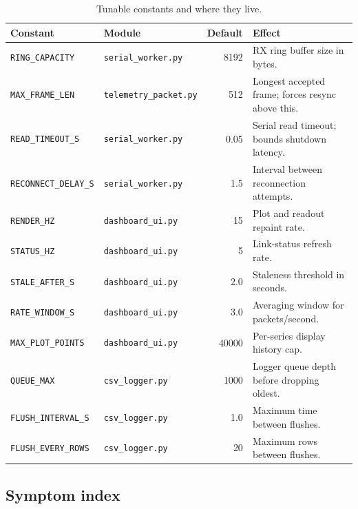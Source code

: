 \documentclass[11pt,a4paper]{article}
\newcommand{\file}[1]{\texttt{#1}}
\newcommand{\code}[1]{\texttt{#1}}
\begin{document}
\begin{table}[htbp]
\centering
\caption{Tunable constants and where they live.}
\label{tab:constants}
\small
\begin{tabularx}{\textwidth}{@{}llrX@{}}
\toprule
\textbf{Constant} & \textbf{Module} & \textbf{Default} & \textbf{Effect}\\
\midrule
\code{RING\_CAPACITY}     & \file{serial\_worker.py} & 8192 & RX ring buffer size in bytes.\\
\code{MAX\_FRAME\_LEN}    & \file{telemetry\_packet.py} & 512 & Longest accepted frame; forces resync above this.\\
\code{READ\_TIMEOUT\_S}   & \file{serial\_worker.py} & 0.05 & Serial read timeout; bounds shutdown latency.\\
\code{RECONNECT\_DELAY\_S}& \file{serial\_worker.py} & 1.5  & Interval between reconnection attempts.\\
\code{RENDER\_HZ}         & \file{dashboard\_ui.py} & 15   & Plot and readout repaint rate.\\
\code{STATUS\_HZ}         & \file{dashboard\_ui.py} & 5    & Link-status refresh rate.\\
\code{STALE\_AFTER\_S}    & \file{dashboard\_ui.py} & 2.0  & Staleness threshold in seconds.\\
\code{RATE\_WINDOW\_S}    & \file{dashboard\_ui.py} & 3.0  & Averaging window for packets/second.\\
\code{MAX\_PLOT\_POINTS}  & \file{dashboard\_ui.py} & 40000& Per-series display history cap.\\
\code{QUEUE\_MAX}         & \file{csv\_logger.py} & 1000 & Logger queue depth before dropping oldest.\\
\code{FLUSH\_INTERVAL\_S} & \file{csv\_logger.py} & 1.0  & Maximum time between flushes.\\
\code{FLUSH\_EVERY\_ROWS} & \file{csv\_logger.py} & 20   & Maximum rows between flushes.\\
\bottomrule
\end{tabularx}
\end{table}

\subsection{Symptom index}
\end{document}
